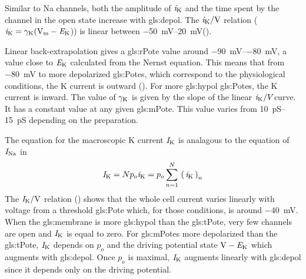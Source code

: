 \documentclass[class={myRUCProject}, crop=false]{standalone}
\begin{document}
Similar to \gls{Na} channels, both the amplitude of \(\mathit{i}_\mathrm{K}\) and the time spent by the channel in the open state increase with \gls{gls:depol}. 
The \(\ucur\potassium/\unit{\V}\) relation (\(\ucur\potassium = \ucon\potassium(\unit{\V\membrane}-\equi\potassium\))) is linear between \qtyrange{-50}{20}{\mV}(\textbf{}). 

Linear back-extrapolation gives a \gls{gls:rPote} value around \qtyrange{-90}{-80}{\mV}, a value close to \(\mathit{E}_\mathrm{K}\) calculated from the Nernst equation. This means that from \qty{-80}{\mV} to more depolarized \glspl{gls:Pote}, which correspond to the physiological conditions, the \gls{K} current is outward (\textbf{}). For more \gls{gls:hypol} \glspl{gls:Pote}, the \gls{K} current is inward. The value of \(\gamma_\mathrm{K}\) is given by the slope of the linear \(\mathit{i}_\mathrm{K}/V\)curve. It has a constant value at any given \gls{gls:mPote}. This value varies from \qtyrange{10}{15}{\pico\siemens} depending on the preparation.



The equation for the macroscopic \gls{K} current \(\mathit{I}_\mathrm{K}\)  is analagous to the equation of \(\mathit{I}_\mathrm{Na}\) in 
\begin{equation}
    \mathit{I}_\mathrm{K} = N p_o \mathit{i}_\mathrm{K} = p_o \sum^N_{n=1} \, \left(\,\mathit{i}_\mathrm{K}\,\right)_n \label{eq:ksum}
\end{equation}
 The \(\curr\potassium/\unit{\V}\) relation (\textbf{}) shows that the whole cell current varies linearly with voltage from a threshold \gls{gls:Pote} which, for those conditions, is around \qty{-40}{\mV}. When the \gls{gls:membrane} is more \gls{gls:hypol} than the \gls{gls:tPote}, very few channels are open and \(\mathit{I}_\mathrm{K}\) is equal to zero. For \glspl{gls:mPote} more depolarized than the \gls{gls:tPote}, \(\mathit{I}_\mathrm{K}\) depends on \(p_o\) and the driving potential state \(\unit{\V} - \equi\potassium\) which augments with \gls{gls:depol}. Once \(p_o\) is maximal, \(\mathit{I}_\mathrm{K}\) augments linearly with \gls{gls:depol} since it depends only on the driving potential. 
\end{document}
